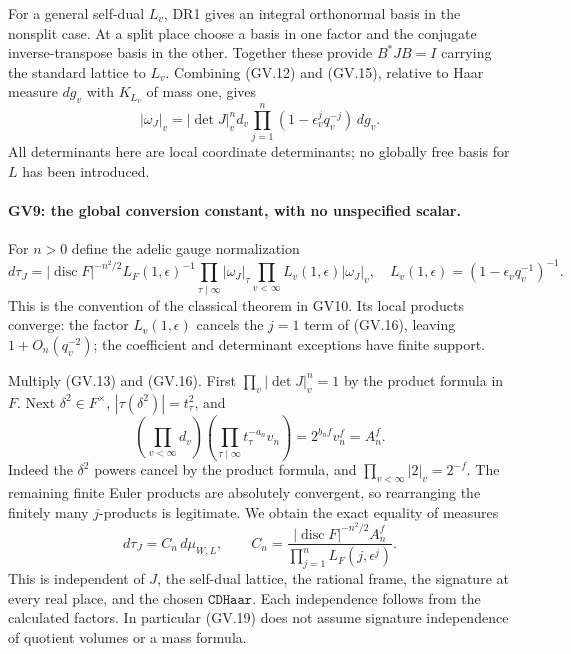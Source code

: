 For a general self-dual $L_v$, DR1 gives an integral orthonormal
basis in the nonsplit case. At a split place choose a basis in one
factor and the conjugate inverse-transpose basis in the other.
Together these provide $B^*JB=I$ carrying the standard lattice to
$L_v$. Combining (GV.12) and (GV.15), relative to Haar measure
$dg_v$ with $K_{L_v}$ of mass one, gives
\[
 |\omega_J|_v
  =|\det J|_v^n d_v
                  \prod_{j=1}^n(1-\epsilon_v^j q_v^{-j})\,dg_v.
 \tag{GV.16}
\]
All determinants here are local coordinate determinants; no
globally free basis for $L$ has been introduced.

\paragraph{GV9: the global conversion constant, with no unspecified scalar.}
For $n>0$ define the adelic gauge normalization
\[
 d\tau_J=|\operatorname{disc}F|^{-n^2/2}L_F(1,\epsilon)^{-1}
        \prod_{\tau\mid\infty}|\omega_J|_\tau
        \prod_{v<\infty}L_v(1,\epsilon)|\omega_J|_v,
 \quad L_v(1,\epsilon)=(1-\epsilon_vq_v^{-1})^{-1}.
 \tag{GV.17}
\]
This is the convention of the classical theorem in GV10.
Its local products converge: the factor $L_v(1,\epsilon)$ cancels
the $j=1$ term of (GV.16), leaving $1+O_n(q_v^{-2})$; the
coefficient and determinant exceptions have finite support.

Multiply (GV.13) and (GV.16). First
$\prod_v|\det J|_v^n=1$ by the product formula in $F$.
Next $\delta^2\in F^\times$, $|\tau(\delta^2)|=t_\tau^2$, and
\[
 \left(\prod_{v<\infty}d_v\right)
                  \left(\prod_{\tau\mid\infty}t_\tau^{-a_n}v_n\right)
     =2^{b_nf}v_n^f=A_n^f.
 \tag{GV.18}
\]
Indeed the $\delta^2$ powers cancel by the product formula, and
$\prod_{v<\infty}|2|_v=2^{-f}$. The remaining finite Euler products
are absolutely convergent, so rearranging the finitely many $j$-products
is legitimate. We obtain the exact equality of measures
\[
 \boxed{\quad d\tau_J=C_n\,d\mu_{W,L},\qquad
 C_n=\frac{|\operatorname{disc}F|^{-n^2/2}A_n^f}
                   {\displaystyle\prod_{j=1}^nL_F(j,\epsilon^j)}.
       \quad}                                      \tag{GV.19}
\]
This is independent of $J$, the self-dual lattice, the rational
frame, the signature at every real place, and the chosen
$\texttt{CDHaar}$. Each independence follows from the calculated
factors. In particular (GV.19) does not assume signature independence
of quotient volumes or a mass formula.

